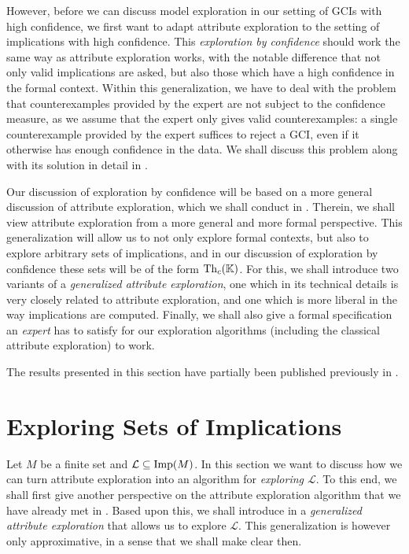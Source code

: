 However, before we can discuss model exploration in our setting of GCIs with high
confidence, we first want to adapt attribute exploration to the setting of implications
with high confidence.  This \emph{exploration by confidence} should work the same way as
attribute exploration works, with the notable difference that not only valid implications
are asked, but also those which have a high confidence in the formal context.  Within this
generalization, we have to deal with the problem that counterexamples provided by the
expert are not subject to the confidence measure, as we assume that the expert only gives
valid counterexamples: a single counterexample provided by the expert suffices to reject a
GCI, even if it otherwise has enough confidence in the data.  We shall discuss this
problem along with its solution in detail in .

Our discussion of exploration by confidence will be based on a more general discussion of
attribute exploration, which we shall conduct in .  Therein, we
shall view attribute exploration from a more general and more formal perspective.  This
generalization will allow us to not only explore formal contexts, but also to explore
arbitrary sets of implications, and in our discussion of exploration by confidence these
sets will be of the form $\operatorname{Th}_c({\mathbb{K}})$.  For this, we shall introduce two variants of a
\emph{generalized attribute exploration}, one which in its technical details is very
closely related to attribute exploration, and one which is more liberal in the way
implications are computed.  Finally, we shall also give a formal specification an
\emph{expert} has to satisfy for our exploration algorithms (including the classical
attribute exploration) to work.

The results presented in this section have partially been published previously in
\cite{Borch-LTCS-13-04}.

\section{Exploring Sets of Implications}
\label{sec:an-abstract-view}

Let $M$ be a finite set and $\mathcal{L} \subseteq \operatorname{Imp}(M)$.  In this section we want to
discuss how we can turn attribute exploration into an algorithm for \emph{exploring
  $\mathcal{L}$}.  To this end, we shall first give another perspective on the attribute
exploration algorithm that we have already met in .  Based upon this,
we shall introduce in  a \emph{generalized attribute
  exploration} that allows us to explore $\mathcal{L}$.  This generalization is however
only approximative, in a sense that we shall make clear then.

